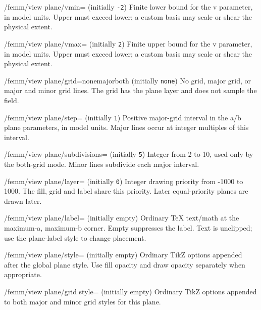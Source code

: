 \begin{key}{/femm/view plane/vmin= (initially \texttt{-2})}
Finite lower bound for the v parameter, in model units. Upper must exceed lower; a custom basis may scale or shear the physical extent.
\end{key}
\begin{key}{/femm/view plane/vmax= (initially \texttt{2})}
Finite upper bound for the v parameter, in model units. Upper must exceed lower; a custom basis may scale or shear the physical extent.
\end{key}
\begin{key}{/femm/view plane/grid=none\textbar major\textbar both (initially \texttt{none})}
No grid, major grid, or major and minor grid lines. The grid has the plane layer and does not sample the field.
\end{key}
\begin{key}{/femm/view plane/step= (initially \texttt{1})}
Positive major-grid interval in the a/b plane parameters, in model units. Major lines occur at integer multiples of this interval.
\end{key}
\begin{key}{/femm/view plane/subdivisions= (initially \texttt{5})}
Integer from 2 to 10, used only by the both-grid mode. Minor lines subdivide each major interval.
\end{key}
\begin{key}{/femm/view plane/layer= (initially \texttt{0})}
Integer drawing priority from -1000 to 1000. The fill, grid and label share this priority. Later equal-priority planes are drawn later.
\end{key}
\begin{key}{/femm/view plane/label= (initially empty)}
Ordinary TeX text/math at the maximum-a, maximum-b corner. Empty suppresses the label. Text is unclipped; use the plane-label style to change placement.
\end{key}
\begin{key}{/femm/view plane/style= (initially empty)}
Ordinary TikZ options appended after the global plane style. Use fill opacity and draw opacity separately when appropriate.
\end{key}
\begin{key}{/femm/view plane/grid style= (initially empty)}
Ordinary TikZ options appended to both major and minor grid styles for this plane.
\end{key}


